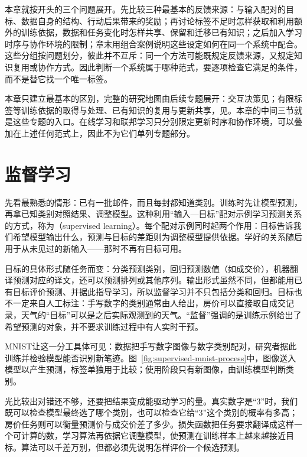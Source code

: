 本章就按开头的三个问题展开。先比较三种最基本的反馈来源：与输入配对的目标、数据自身的结构、行动后果带来的奖励；再讨论标签不足时怎样获取和利用额外的训练依据，数据和任务变化时怎样共享、保留和迁移已有知识；之后加入学习时序与协作环境的限制；章末用组合案例说明这些设定如何在同一个系统中配合。这些分组按问题划分，彼此并不互斥：同一个方法可能既规定反馈来源，又规定知识复用或协作方式。因此判断一个系统属于哪种范式，要逐项检查它满足的条件，而不是替它找一个唯一标签。

本章只建立最基本的区别，完整的研究地图由后续专题展开：交互决策见；有限标签等训练依据的取得与处理、已有知识的复用与更新共享，见。本章的中间三节就是这些专题的入口。在线学习和联邦学习只分别限定更新时序和协作环境，可以叠加在上述任何范式上，因此不为它们单列专题部分。

\section{监督学习}
\label{sec:supervised-learning}

先看最熟悉的情形：已有一批邮件，而且每封都知道类别。训练时先让模型预测，再拿已知类别对照结果、调整模型。这种利用“输入—目标”配对示例学习预测关系的方式，称为（supervised learning）。每个配对示例同时起两个作用：目标告诉我们希望模型输出什么，预测与目标的差距则为调整模型提供依据。学好的关系随后用于从未见过的新输入——那时不再有目标可用。

目标的具体形式随任务而变：分类预测类别，回归预测数值（如成交价），机器翻译预测对应的译文，还可以预测排列或其他序列。输出形式虽然不同，但都能用已有目标评价预测、并据此指导学习，所以监督学习并不只包括分类和回归。目标也不一定来自人工标注：手写数字的类别通常由人给出，房价可以直接取自成交记录，天气的“目标”可以是之后实际观测到的天气。“监督”强调的是训练示例给出了希望预测的对象，并不要求训练过程中有人实时干预。

MNIST让这一分工具体可见：数据把手写数字图像与数字类别配对，研究者据此训练并检验模型能否识别新笔迹。图~\ref{fig:supervised-mnist-process}中，图像送入模型以产生预测，标签单独用于比较；使用阶段只有新图像，由训练模型判断类别。

光比较出对错还不够，还要把结果变成能驱动学习的量。真实数字是“3”时，我们既可以检查模型最终选了哪个类别，也可以检查它给“3”这个类别的概率有多高；房价任务则可以衡量预测价与成交价差了多少。损失函数把任务要求翻译成这样一个可计算的数，学习算法再依据它调整模型，使预测在训练样本上越来越接近目标。算法可以千差万别，但都必须先说明怎样评价一个候选预测。

